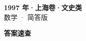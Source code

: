 \documentclass[zihao=-4, a4paper]{ctexart}
\begin{document}
\begin{center}
  {\Large\bfseries 1997 年·上海卷·文史类}\\[4pt]
  {\large 数学 · 简答版}
\end{center}
\medskip
{}

\clearpage
{}
\begin{center}{\Large\bfseries 答案速查}\end{center}
\medskip

\end{document}
